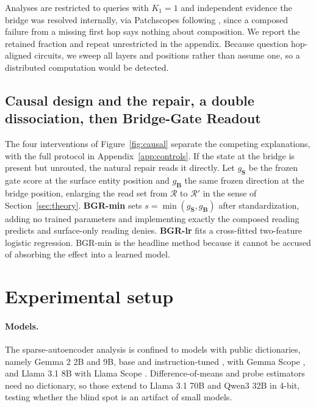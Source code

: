 \documentclass{article}
\newcommand{\gate}{\mathbf{S}}
\newcommand{\bridge}{\mathbf{B}}
\begin{document}
Analyses are restricted to queries with $K_1=1$ and independent evidence the bridge was resolved
internally, via Patchscopes \citep{ghandeharioun2024patchscopes} following \citet{biran2024hopping},
since a composed failure from a missing first hop says nothing about composition. We report the
retained fraction and repeat unrestricted in the appendix. Because \citet{layerorder2026} question
hop-aligned circuits, we sweep all layers and positions rather than assume one, so a distributed
computation would be detected.

\subsection{Causal design and the repair, a double dissociation, then Bridge-Gate Readout}
\label{sec:causal-design}
\label{sec:bgr}

The four interventions of Figure~\ref{fig:causal} separate the competing explanations, with the full
protocol in Appendix~\ref{app:controls}. If the state at the bridge is present but unrouted, the
natural repair reads it directly. Let $g_{\gate}$ be the frozen gate score at the surface entity
position and $g_{\bridge}$ the same
frozen direction at the bridge position, enlarging the read set from $\mathcal{R}$ to $\mathcal{R}'$
in the sense of Section~\ref{sec:theory}. \textbf{BGR-min} sets
$s=\min(g_{\gate},g_{\bridge})$ after standardization, adding no trained parameters and implementing
exactly the composed reading predicts and surface-only reading denies. \textbf{BGR-lr} fits a cross-fitted
two-feature logistic regression. BGR-min is the headline method because it cannot be accused of
absorbing the effect into a learned model.

\section{Experimental setup}

\paragraph{Models.} The sparse-autoencoder analysis is confined to models with public dictionaries,
namely Gemma 2 2B and 9B, base and instruction-tuned \citep{gemma2024}, with Gemma Scope
\citep{lieberum2024gemmascope}, and Llama 3.1 8B \citep{dubey2024llama} with Llama Scope
\citep{he2024llamascope}. Difference-of-means and probe estimators need no dictionary, so those
extend to Llama 3.1 70B and Qwen3 32B \citep{qwen3} in 4-bit, testing whether the blind spot is an
artifact of small models.
\end{document}
